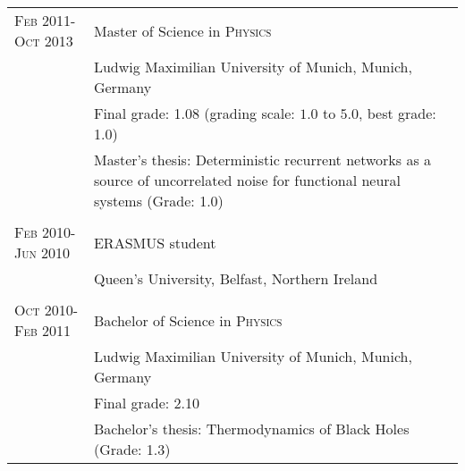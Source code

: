 \begin{longtable}{>{\hfill}p{3.3cm}|p{12.0cm}}
  \textsc{Feb} 2011-\textsc{Oct} 2013 & Master of Science in \textsc{Physics} \\
  & \footnotesize Ludwig Maximilian University of Munich, Munich, Germany \\
  & \footnotesize Final grade: 1.08 (grading scale: $1.0$ to $5.0$, best grade: 1.0) \\
  & \footnotesize Master's thesis: Deterministic recurrent networks as
  a source of uncorrelated noise for
  functional neural systems (Grade: 1.0) \\
  \multicolumn{2}{c}{} \\
  \textsc{Feb} 2010-\textsc{Jun} 2010 & ERASMUS student \\
  & \footnotesize Queen's University, Belfast, Northern Ireland \\
  \multicolumn{2}{c}{} \\
  \textsc{Oct} 2010-\textsc{Feb} 2011 & Bachelor of Science in \textsc{Physics} \\
  & \footnotesize Ludwig Maximilian University of Munich, Munich, Germany \\
  & \footnotesize Final grade: 2.10 \\
  & \footnotesize Bachelor's thesis: Thermodynamics of Black Holes (Grade: 1.3) \\
\end{longtable}

